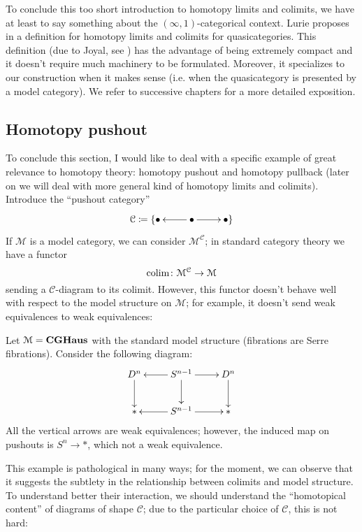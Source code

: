 \begin{refsection}
\begin{rmk}
To conclude this too short introduction to homotopy limits and colimits, we have at least to say something about the $(\infty,1)$-categorical context. Lurie proposes in \cite{htt} a definition for homotopy limits and colimits for quasicategories. This definition (due to Joyal, see \cite{joyal}) has the advantage of being extremely compact and it doesn't require much machinery to be formulated. Moreover, it specializes to our construction when it makes sense (i.e. when the quasicategory is presented by a model category). We refer to successive chapters for a more detailed exposition.
\end{rmk}

\subsection{Homotopy pushout} \label{homotopy pushout}

To conclude this section, I would like to deal with a specific example of great relevance to homotopy theory: homotopy pushout and homotopy pullback (later on we will deal with more general kind of homotopy limits and colimits). Introduce the ``pushout category''
\[
\xymatrix{
\mathcal C\coloneqq \{ \bullet & \bullet \ar[l] \ar[r] & \bullet \}
}
\]
If $\mathcal M$ is a model category, we can consider $\mathcal M^{\mathcal C}$; in standard category theory we have a functor
\[
\operatorname*{colim} \colon \mathcal M^{\mathcal C} \to \mathcal M
\]
sending a $\mathcal C$-diagram to its colimit. However, this functor doesn't behave well with respect to the model structure on $\mathcal M$; for example, it doesn't send weak equivalences to weak equivalences:

\begin{eg} \label{eg pushout fails in homotopy}
Let $\mathcal M = \mathbf{CGHaus}$ with the standard model structure (fibrations are Serre fibrations). Consider the following diagram:
\[
\xymatrix{
D^n \ar[d] & S^{n-1} \ar[l] \ar[r] \ar[d] & D^n \ar[d] \\ \mathrm{*} & S^{n-1} \ar[r] \ar[l] & \mathrm{*}
}
\]
All the vertical arrows are weak equivalences; however, the induced map on pushouts is $S^n \to *$, which not a weak equivalence.
\end{eg}

This example is pathological in many ways; for the moment, we can observe that it suggests the subtlety in the relationship between colimits and model structure. To understand better their interaction, we should understand the ``homotopical content'' of diagrams of shape $\mathcal C$; due to the particular choice of $\mathcal C$, this is not hard:


\end{refsection}
